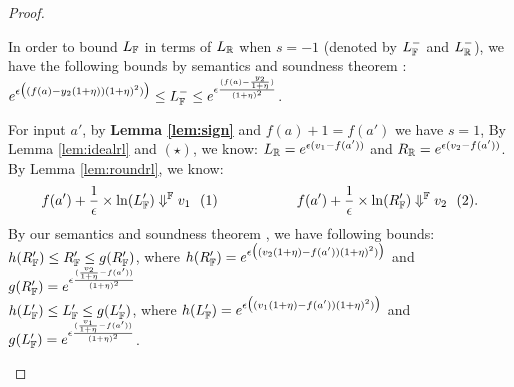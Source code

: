 \documentclass[a4paper,11pt]{article}
\begin{document}
\begin{proof}
\begin{itemize}
\begin{itemize}
	In order to bound $L_{\mathbb{F}}$ in terms of $L_{\mathbb{R}}$ when $s = -1$ (denoted by $L_{\mathbb{F}}^-$ and $L_{\mathbb{R}}^-$), we have the following bounds by semantics and soundness theorem :		%
		$e^{\epsilon 
				\big( (f(a) - y_2(1 + \eta)) (1 + \eta)^2) \big)}
        \leq
        L_{\mathbb{F}}^- \leq
        e^{\epsilon 
				\frac{(f(a) - \frac{y_2}{1 + \eta})}{(1 + \eta)^2}}$.
	\end{itemize}
		For input $a'$, by \textbf{Lemma \ref{lem:sign}} and $f(a) + 1 = f(a')$ we have $s = 1$, 
		By Lemma \ref{lem:idealrl} and $(\star) $, we know: $L_{\mathbb{R}} = e^{\epsilon(v_1 - f(a'))}$ and 
		$R_{\mathbb{R}} = e^{\epsilon(v_2 - f(a'))}$.
		\\
		By Lemma \ref{lem:roundrl}, we know:
		$$f(a') + \frac{1}{\epsilon} \times \ln(L_{\mathbb{F}}') \Downarrow^{\mathbb{F}} v_1 ~~ (1)
		~~~~~~~~~~~~~~~~~
		f(a') + \frac{1}{\epsilon} \times \ln(R_{\mathbb{F}}') \Downarrow^{\mathbb{F}} v_2 ~~ (2).$$
		By our semantics and soundness theorem , we have following bounds:
		\\
		$h(R_{\mathbb{F}}') \leq R_{\mathbb{F}}' \leq g(R_{\mathbb{F}}')$,
		where 
		$h(R_{\mathbb{F}}') = e^{\epsilon 
		\big( (v_2(1 + \eta) - f(a')) (1 + \eta)^2) \big)}$ 
		and
		$g(R_{\mathbb{F}}') = e^{\epsilon \frac{(\frac{v_2}{1 + \eta} - f(a'))}
		{(1 + \eta)^2}}$
		\\
		$h(L_{\mathbb{F}}') \leq L_{\mathbb{F}}' \leq g(L_{\mathbb{F}}')$, 
		where 
		$h(L_{\mathbb{F}}') = e^{\epsilon 
		\big( (v_1(1 + \eta) - f(a')) (1 + \eta)^2) \big)}$ 
		and
		$g(L_{\mathbb{F}}') = e^{\epsilon \frac{(\frac{v_1}{1 + \eta} - f(a'))}
		{(1 + \eta)^2}}$.



\end{itemize}
\end{proof}
\end{document}
